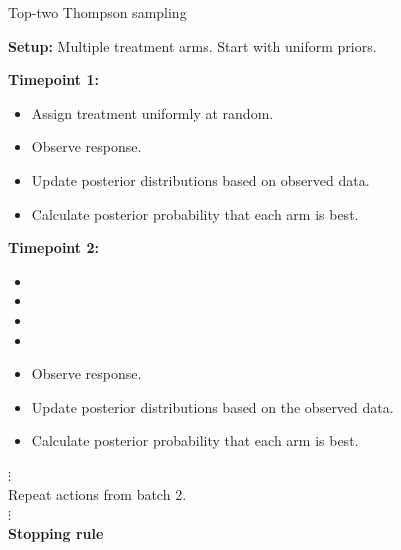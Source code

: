 \documentclass[xcolor={table}]{beamer}
\begin{document}
\begin{frame}{Top-two Thompson sampling \citep{russo2016simple}}
\scriptsize

\textbf{Setup:} Multiple treatment arms. Start with uniform priors.

 \textbf{Timepoint 1:} 
\begin{itemize}
\item Assign treatment uniformly at random. 
\item Observe response. 
\item Update posterior distributions based on observed data.
\item Calculate posterior probability that each arm is best. %
\end{itemize}

 \textbf{Timepoint 2:} 
\begin{itemize}
\large
\item[$\rightarrow$]  
\item[$\rightarrow$]  
\item[$\rightarrow$] 
\item[$\rightarrow$] 
\item Observe response. 
\item Update posterior distributions based on the observed data. 
\item Calculate posterior probability that each arm is best.\\
\end{itemize}

\hspace{15 pt} $\vdots$\\
Repeat actions from batch 2. \\
\hspace{15 pt} $\vdots$\\
 \textbf{Stopping rule} 

\hyperlink{ttts}{}\hypertarget<1>{ttts-explainer}{}
\end{frame}
\end{document}
